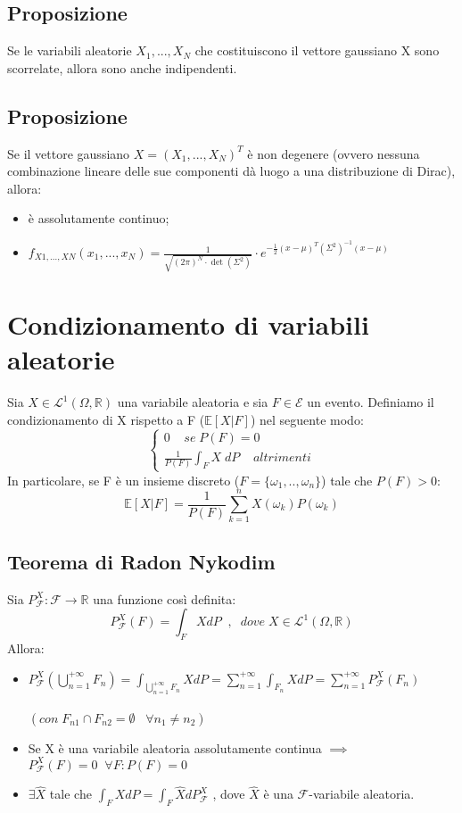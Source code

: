 \documentclass{article}
\begin{document}
\subsection*{Proposizione}
Se le variabili aleatorie $X_{1},...,X_{N}$ che costituiscono il vettore gaussiano X sono scorrelate, allora sono anche indipendenti.

\subsection*{Proposizione}
Se il vettore gaussiano $X = (X_{1},...,X_{N})^{T}$ è non degenere (ovvero nessuna combinazione lineare delle sue componenti dà luogo a una distribuzione di Dirac), allora:
\begin{itemize}
\item è assolutamente continuo;
\item $f_{X1,...,XN}(x_{1},...,x_{N}) = \frac{1}{\sqrt{(2\pi)^{N}\cdot \det(\Sigma^{2})}}\cdot e^{-\frac{1}{2}(x-\mu)^{T}(\Sigma^{2})^{-1}(x-\mu)}$
\end{itemize}

\section*{Condizionamento di variabili aleatorie}
Sia $X \in \mathcal{L}^{1}(\Omega, \mathbb{R})$ una variabile aleatoria e sia $F \in \mathcal{E}$ un evento. Definiamo il condizionamento di X rispetto a F ($\mathbb{E}[X|F]$) nel seguente modo:
\[
\begin{cases}
0 \; \; \; \; se \; P(F) = 0\\
\frac{1}{P(F)} \int_{F}^{}X \; dP \; \; \; \; altrimenti
\end{cases}
\]
In particolare, se F è un insieme discreto ($F = \{\omega_{1},..,\omega_{n}\}$) tale che $P(F) > 0$:
\[ \mathbb{E}[X|F] = \frac{1}{P(F)} \sum_{k=1}^{n}X(\omega_{k}) P(\omega_{k}) \]

\subsection*{Teorema di Radon Nykodim}
Sia $P_{\mathcal{F}}^{X}: \mathcal{F} \to \mathbb{R}$ una funzione così definita:
\[ P_{\mathcal{F}}^{X}(F) = \int_{F}^{}X dP \; \; , \; \; dove \; X \in \mathcal{L}^{1}(\Omega, \mathbb{R}) \]
Allora:
\begin{itemize}
\item $P_{\mathcal{F}}^{X}(\bigcup_{n=1}^{+\infty}F_{n}) = \int_{\bigcup_{n=1}^{+\infty}F_{n}}^{}X dP = \sum_{n=1}^{+\infty} \int_{F_{n}}^{}X dP = \sum_{n=1}^{+\infty}P_{\mathcal{F}}^{X}(F_{n}) $\\ \\
$(con \; F_{n1} \cap F_{n2} = \emptyset \; \; \; \forall n_{1} \neq n_{2})$
\item Se X è una variabile aleatoria assolutamente continua $\implies$\\
$P_{\mathcal{F}}^{X}(F) = 0 \; \; \forall F : P(F) = 0$
\item $\exists \hat{X}$ tale che $\int_{F}^{}X dP = \int_{F}^{}\hat{X} dP_{\mathcal{F}}^{X}$  ,  dove $\hat{X}$ è una $\mathcal{F}$-variabile aleatoria.
\end{itemize}
\end{document}
